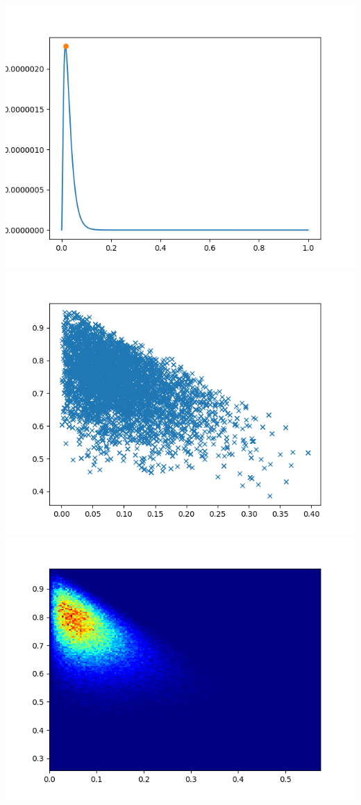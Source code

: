 \documentclass[pt12]{article}
\begin{document}
\newpage

\begin{center}
\includegraphics[scale=0.5]{hip15.png}\\
\includegraphics[scale=0.5]{sc15.png}\\
\includegraphics[scale=0.5]{den15.png}\\
\end{center}
\end{document}
